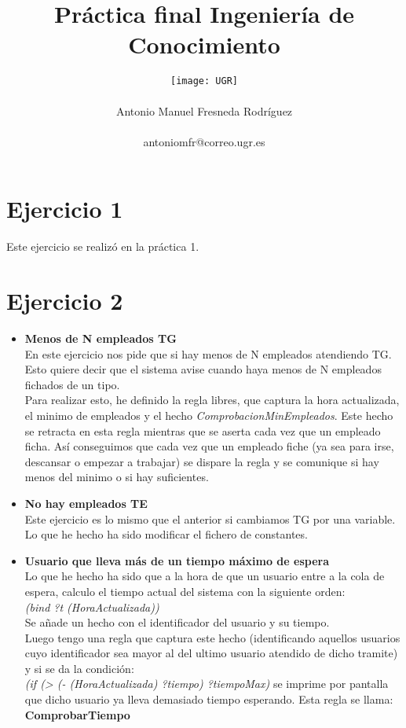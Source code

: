 \documentclass[10pt,spanish]{article}
\author{
	\texttt{[image: UGR]} \\\\
	\Large 	Antonio Manuel Fresneda Rodríguez\\
	\\antoniomfr@correo.ugr.es
	\\
}
\date{}
\title{\huge \textbf{Práctica final Ingeniería de Conocimiento}}
\begin{document}
	\maketitle
	\pagebreak
	\tableofcontents
	\pagebreak
	\section{Ejercicio 1}
	Este ejercicio se realizó en la práctica 1.
	\section{Ejercicio 2}
	\begin{itemize}
		\item \textbf{Menos de N empleados TG}\\
		En este ejercicio nos pide que si hay menos de N empleados atendiendo TG. Esto quiere decir que el sistema avise cuando haya menos de N empleados fichados de un tipo. \\
		Para realizar esto, he definido la regla libres, que captura la hora actualizada, el minimo de empleados y el hecho \textit{ComprobacionMinEmpleados}. Este hecho se retracta en esta regla mientras que se aserta
		cada vez que un empleado ficha. Así conseguimos que cada vez que un empleado fiche (ya sea para irse, descansar o empezar a trabajar) se dispare la regla y se comunique si hay menos del minimo o si hay suficientes.
		\item \textbf{No hay empleados TE}\\
		Este ejercicio es lo mismo que el anterior si cambiamos TG por una variable. Lo que he hecho ha sido modificar el fichero de constantes.
		\item \textbf{Usuario que lleva más de un tiempo máximo de espera}\\
		Lo que he hecho ha sido que a la hora de que un usuario entre a la cola de espera, calculo el tiempo actual del sistema con la siguiente orden:\\ \textit{(bind ?t (HoraActualizada))
		}\\
		Se añade un hecho con el identificador del usuario y su tiempo. \\
		Luego tengo una regla que captura este hecho  (identificando aquellos usuarios cuyo identificador sea mayor al del ultimo usuario atendido de dicho tramite) y si se da la condición:\\ \textit{(if (> (- (HoraActualizada) ?tiempo) ?tiempoMax)} se imprime por pantalla que dicho usuario ya lleva demasiado tiempo esperando. Esta regla se llama: \textbf{ComprobarTiempo}

\end{itemize}
\end{document}
